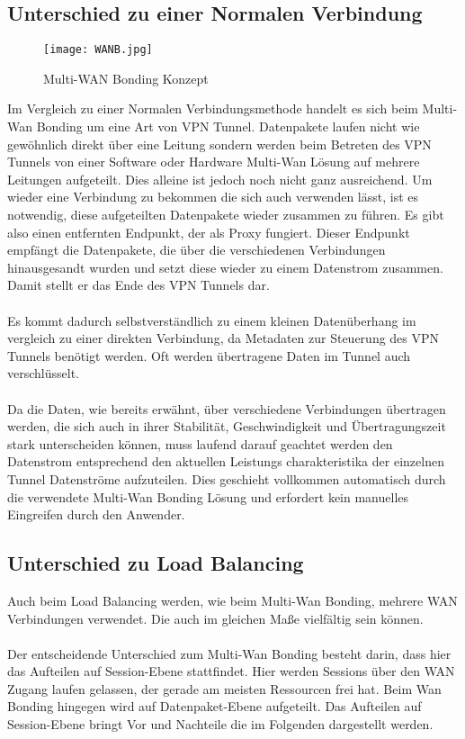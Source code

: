 \subsection{Unterschied zu einer Normalen Verbindung}
\begin{figure}[h]
    \centering
    \texttt{[image: WANB.jpg]}
    \caption[WANB]{Multi-WAN Bonding Konzept}%
\end{figure}
Im Vergleich zu einer Normalen Verbindungsmethode handelt es sich beim Multi-Wan Bonding um eine Art von VPN Tunnel. Datenpakete laufen nicht wie gewöhnlich direkt über eine Leitung sondern werden beim Betreten des VPN Tunnels von einer Software oder Hardware Multi-Wan Lösung auf mehrere Leitungen aufgeteilt. Dies alleine ist jedoch noch nicht ganz ausreichend. Um wieder eine Verbindung zu bekommen die sich auch verwenden lässt, ist es notwendig, diese aufgeteilten Datenpakete wieder zusammen zu führen. Es gibt also einen entfernten Endpunkt, der als Proxy fungiert. Dieser Endpunkt empfängt die Datenpakete, die über die verschiedenen Verbindungen hinausgesandt wurden und setzt diese wieder zu einem Datenstrom zusammen. Damit stellt er das Ende des VPN Tunnels dar. 
\\\\
Es kommt dadurch selbstverständlich zu einem kleinen Datenüberhang im vergleich zu einer direkten Verbindung, da Metadaten zur Steuerung des VPN Tunnels benötigt werden. Oft werden übertragene Daten im Tunnel auch verschlüsselt.
\\\\
Da die Daten, wie bereits erwähnt, über verschiedene Verbindungen übertragen werden, die sich auch in ihrer Stabilität, Geschwindigkeit und Übertragungszeit stark unterscheiden können, muss laufend darauf geachtet werden den Datenstrom entsprechend den aktuellen Leistungs charakteristika der einzelnen Tunnel Datenströme aufzuteilen. Dies geschieht vollkommen automatisch durch die verwendete Multi-Wan Bonding Lösung und erfordert kein manuelles Eingreifen durch den Anwender.

\subsection{Unterschied zu Load Balancing}
Auch beim Load Balancing werden, wie beim Multi-Wan Bonding, mehrere WAN Verbindungen verwendet. Die auch im gleichen Maße vielfältig sein können.
\\\\
Der entscheidende Unterschied zum Multi-Wan Bonding besteht darin, dass hier das Aufteilen auf Session-Ebene stattfindet. Hier werden Sessions über den WAN Zugang laufen gelassen, der gerade am meisten Ressourcen frei hat. Beim Wan Bonding hingegen wird auf Datenpaket-Ebene aufgeteilt. Das Aufteilen auf Session-Ebene bringt Vor und Nachteile die im Folgenden dargestellt werden.
